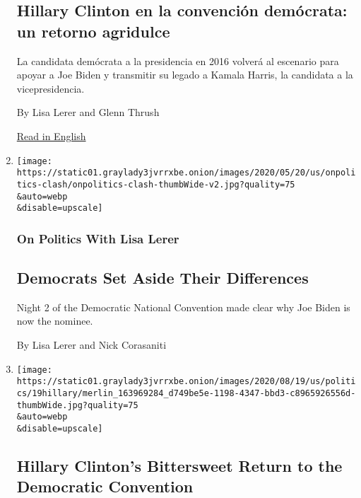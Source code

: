 \begin{enumerate}
{  \subsection{Hillary Clinton en la convención demócrata: un retorno
  agridulce}\label{hillary-clinton-en-la-convenciuxf3n-demuxf3crata-un-retorno-agridulce}}

  La candidata demócrata a la presidencia en 2016 volverá al escenario
  para apoyar a Joe Biden y transmitir su legado a Kamala Harris, la
  candidata a la vicepresidencia.

  By Lisa Lerer and Glenn Thrush

  \href{https://www.nytimes3xbfgragh.onion/2020/08/19/us/politics/hillary-clinton-democratic-convention.html}{Read
  in English}
\item
  \href{/2020/08/19/us/politics/democratic-convention-biden-trump.html}{}

  \texttt{[image: https://static01.graylady3jvrrxbe.onion/images/2020/05/20/us/onpolitics-clash/onpolitics-clash-thumbWide-v2.jpg?quality=75\\\&auto=webp\\\&disable=upscale]}

  \hypertarget{on-politics-with-lisa-lerer}{%
  \subsubsection{On Politics With Lisa
  Lerer}\label{on-politics-with-lisa-lerer}}

  \hypertarget{democrats-set-aside-their-differences}{%
  \subsection{Democrats Set Aside Their
  Differences}\label{democrats-set-aside-their-differences}}

  Night 2 of the Democratic National Convention made clear why Joe Biden
  is now the nominee.

  By Lisa Lerer and Nick Corasaniti
\item
  \href{/2020/08/19/us/politics/hillary-clinton-democratic-convention.html}{}

  \texttt{[image: https://static01.graylady3jvrrxbe.onion/images/2020/08/19/us/politics/19hillary/merlin\_163969284\_d749be5e-1198-4347-bbd3-c8965926556d-thumbWide.jpg?quality=75\\\&auto=webp\\\&disable=upscale]}

  \hypertarget{hillary-clintons-bittersweet-return-to-the-democratic-convention}{%
  \subsection{Hillary Clinton's Bittersweet Return to the Democratic
  Convention}\label{hillary-clintons-bittersweet-return-to-the-democratic-convention}}


\end{enumerate}
